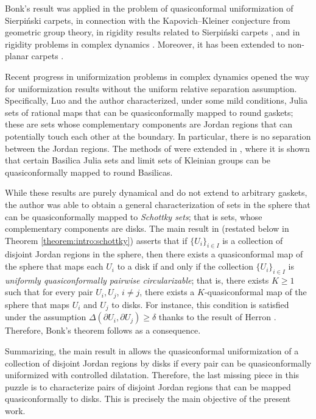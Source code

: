 \documentclass[letterpaper]{amsart}
\theoremstyle{plain}
\theoremstyle{definition}
\theoremstyle{remark}
\numberwithin{equation}{section}
\numberwithin{theorem}{section}
\begin{document}
Bonk's result was applied in the problem of quasiconformal uniformization of Sierpi\'nski carpets, in connection with the Kapovich--Kleiner conjecture from geometric group theory, in rigidity results related to Sierpi\'nski carpets \cites{BonkMerenkov:rigidity, BonkMerenkov:rigiditySpCarpets}, and in rigidity problems in complex dynamics \cite{BonkLyubichMerenkov:carpetJulia}. Moreover, it has been extended to non-planar carpets \cites{MerenkovWildrick:uniformization,Rehmert:thesis}.

Recent progress in uniformization problems in complex dynamics opened the way for uniformization results without the uniform relative separation assumption. Specifically, Luo and the author \cite{LuoNtalampekos:gasket} characterized, under some mild conditions, Julia sets of rational maps that can be quasiconformally mapped to round gaskets; these are sets whose complementary components are Jordan regions that can potentially touch each other at the boundary. In particular, there is no separation between the Jordan regions. The methods of \cite{LuoNtalampekos:gasket} were extended in \cite{LuoMjMukherjee:basilica}, where it is shown that certain Basilica Julia sets and limit sets of Kleinian groups can be quasiconformally mapped to round Basilicas. 

While these results are purely dynamical and do not extend to arbitrary gaskets, the author \cite{Ntalampekos:schottky} was able to obtain a general characterization of sets in the sphere that can be quasiconformally mapped to \textit{Schottky sets}; that is sets, whose complementary components are disks. The main result in \cite{Ntalampekos:schottky} (restated below in Theorem \ref{theorem:intro:schottky}) asserts that if $\{U_i\}_{i\in I}$ is a collection of disjoint Jordan regions in the sphere, then there exists a quasiconformal map of the sphere that maps each $U_i$ to a disk if and only if the collection $\{U_i\}_{i\in I}$ is \textit{uniformly quasiconformally pairwise circularizable}; that is, there exists $K\geq 1$ such that for every pair $U_i,U_j$, $i\neq j$, there exists a $K$-quasiconformal map of the sphere that maps $U_i$ and $U_j$ to disks. For instance, this condition is satisfied under the assumption $\Delta(\partial U_i,\partial U_j)\geq \delta$ thanks to the result of Herron \cite{Herron:uniform}. Therefore, Bonk's theorem follows as a consequence. 

Summarizing, the main result in \cite{Ntalampekos:schottky} allows the quasiconformal uniformization of a collection of disjoint Jordan regions by disks if every pair can be quasiconformally uniformized with controlled dilatation. Therefore, the last missing piece in this puzzle is to characterize pairs of disjoint Jordan regions that can be mapped quasiconformally to disks. This is precisely the main objective of the present work. 
\end{document}

